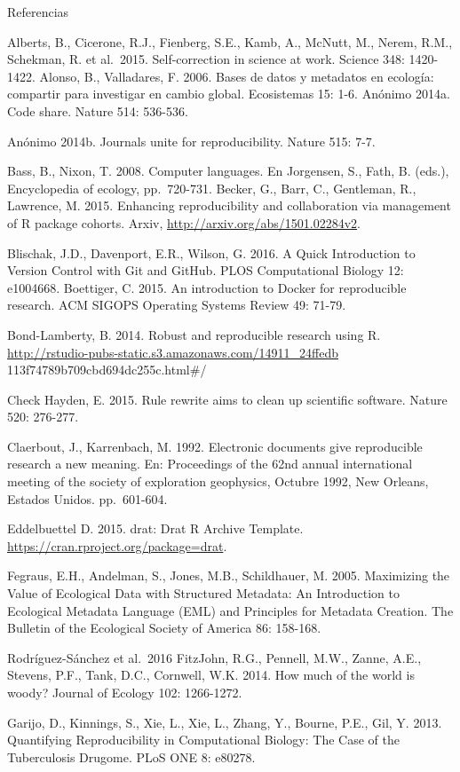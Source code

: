 \documentclass[]{tufte-handout}
\begin{document}
Referencias

Alberts, B., Cicerone, R.J., Fienberg, S.E., Kamb, A., McNutt, M.,
Nerem, R.M., Schekman, R. et al.~2015. Self-correction in science at
work. Science 348: 1420-1422. Alonso, B., Valladares, F. 2006. Bases de
datos y metadatos en ecología: compartir para investigar en cambio
global. Ecosistemas 15: 1-6. Anónimo 2014a. Code share. Nature 514:
536-536.

Anónimo 2014b. Journals unite for reproducibility. Nature 515: 7-7.

Bass, B., Nixon, T. 2008. Computer languages. En Jorgensen, S., Fath, B.
(eds.), Encyclopedia of ecology, pp.~720-731. Becker, G., Barr, C.,
Gentleman, R., Lawrence, M. 2015. Enhancing reproducibility and
collaboration via management of R package cohorts. Arxiv,
\url{http://arxiv.org/abs/1501.02284v2}.

Blischak, J.D., Davenport, E.R., Wilson, G. 2016. A Quick Introduction
to Version Control with Git and GitHub. PLOS Computational Biology 12:
e1004668. Boettiger, C. 2015. An introduction to Docker for reproducible
research. ACM SIGOPS Operating Systems Review 49: 71-79.

Bond-Lamberty, B. 2014. Robust and reproducible research using R.
\url{http://rstudio-pubs-static.s3.amazonaws.com/14911_24ffedb}
113f74789b709cbd694dc255c.html\#/

Check Hayden, E. 2015. Rule rewrite aims to clean up scientific
software. Nature 520: 276-277.

Claerbout, J., Karrenbach, M. 1992. Electronic documents give
reproducible research a new meaning. En: Proceedings of the 62nd annual
international meeting of the society of exploration geophysics, Octubre
1992, New Orleans, Estados Unidos. pp.~601-604.

Eddelbuettel D. 2015. drat: Drat R Archive Template.
\url{https://cran.rproject.org/package=drat}.

Fegraus, E.H., Andelman, S., Jones, M.B., Schildhauer, M. 2005.
Maximizing the Value of Ecological Data with Structured Metadata: An
Introduction to Ecological Metadata Language (EML) and Principles for
Metadata Creation. The Bulletin of the Ecological Society of America 86:
158-168.

Rodríguez-Sánchez et al.~2016 FitzJohn, R.G., Pennell, M.W., Zanne,
A.E., Stevens, P.F., Tank, D.C., Cornwell, W.K. 2014. How much of the
world is woody? Journal of Ecology 102: 1266-1272.

Garijo, D., Kinnings, S., Xie, L., Xie, L., Zhang, Y., Bourne, P.E.,
Gil, Y. 2013. Quantifying Reproducibility in Computational Biology: The
Case of the Tuberculosis Drugome. PLoS ONE 8: e80278.
\end{document}
